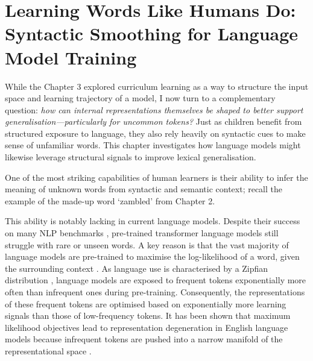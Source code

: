 \chapter{Learning Words Like Humans Do: Syntactic Smoothing for Language Model Training}

While the Chapter 3 explored curriculum learning as a way to structure the input space and learning trajectory of a model, I now turn to a complementary question: \emph{how can internal representations themselves be shaped to better support generalisation—particularly for uncommon tokens?} Just as children benefit from structured exposure to language, they also rely heavily on syntactic cues to make sense of unfamiliar words. This chapter investigates how language models might likewise leverage structural signals to improve lexical generalisation.

One of the most striking capabilities of human learners is their ability to infer the meaning of unknown words from syntactic and semantic context; recall the example of the made-up word `zambled' from Chapter 2.



This ability is notably lacking in current language models. Despite their success on many NLP benchmarks \citep{touvron2023llama, chowdhery2023palm}, pre-trained transformer language models still struggle with rare or unseen words. A key reason is that the vast majority of language models are pre-trained to maximise the log-likelihood of a word, given the surrounding context \citep{devlin2019bert, brown2020gpt3, chowdhery2023palm, touvron2023llama}. As language use is characterised by a Zipfian distribution \citep{zipf1935zipflaw}, language models are exposed to frequent tokens exponentially more often than infrequent ones during pre-training. Consequently, the representations of these frequent tokens are optimised based on exponentially more learning signals than those of low-frequency tokens. It has been shown that maximum likelihood objectives lead to representation degeneration in English language models because infrequent tokens are pushed into a narrow manifold of the representational space \citep{gao2018representation}. 

